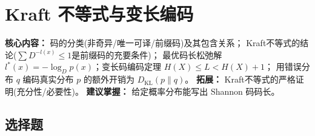 \documentclass[12pt,a4paper]{ctexart}
\newcommand{\DKL}{D_{\mathrm{KL}}}
\begin{document}
\newpage

\section{Kraft 不等式与变长编码}

\begin{notetested}
\textbf{核心内容：} 码的分类(非奇异/唯一可译/前缀码)及其包含关系；
Kraft不等式的结论($\sum D^{-l(x)} \leq 1$是前缀码的充要条件)；
最优码长松弛解 $l^*(x) = -\log_D p(x)$；变长码编码定理 $H(X) \leq L < H(X)+1$；
用错误分布 $q$ 编码真实分布 $p$ 的额外开销为 $\DKL(p\|q)$。
\textbf{拓展：} Kraft不等式的严格证明(充分性/必要性)。
\textbf{建议掌握：} 给定概率分布能写出 Shannon 码码长。
\end{notetested}

\subsection*{选择题}
\end{document}
